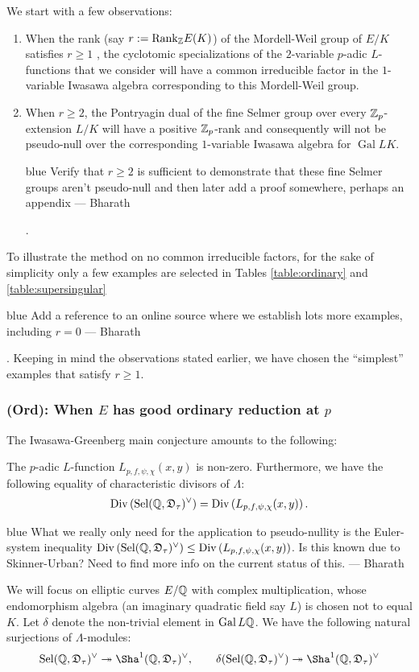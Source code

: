 \documentclass[a4paper,11pt]{article}
\newcommand{\BP}[1]{
	\begin{color}{blue}
		\marginpar{$\heartsuit$} #1
		--- Bharath
	\end{color}
}
\DeclareMathOperator{\Gal}{Gal}
\numberwithin{equation}{section}
\newcommand{\Sel}{\mathrm{Sel}}
\newcommand{\DDD}{\mathfrak{D}}
\begin{document}
We start with a few observations:
\begin{enumerate}
\item When the rank (say $r:=\mathrm{Rank}_{\mathbb{Z}}E(K)$) of the Mordell-Weil group of $E/K$ satisfies $r\geq 1$ , the cyclotomic specializations of the $2$-variable $p$-adic $L$-functions that we consider will have a common irreducible factor in the $1$-variable Iwasawa algebra corresponding to this Mordell-Weil group.
\item When $r \geq 2$, the Pontryagin dual of the fine Selmer group over every $\mathbb{Z}_p$-extension $L/K$ will have a positive $\mathbb{Z}_p$-rank and consequently  will not be pseudo-null over the corresponding $1$-variable Iwasawa algebra for $\Gal{L}{K}$. \BP{Verify that $r\geq 2$ is sufficient to demonstrate that these fine Selmer groups aren't pseudo-null and then later add a proof somewhere, perhaps an appendix}.
\end{enumerate}


To illustrate the method on no common irreducible factors, for the sake of simplicity only a few examples are selected in Tables \ref{table:ordinary} and \ref{table:supersingular} \BP{Add a reference to an online source where we establish lots more examples, including $r=0$}. Keeping in mind the observations stated earlier, we have chosen the ``simplest'' examples that satisfy $r \geq 1$.



\subsubsection*{(Ord): When $E$ has good ordinary reduction at $p$}
The Iwasawa-Greenberg main conjecture amounts to the following:
\begin{conjecture}\label{conj:ordmain}
The $p$-adic $L$-function $L_{p,f,\psi,\chi}(x,y)$ is non-zero. Furthermore, we have the following equality of characteristic divisors of $\Lambda$:
\begin{align*}
\mathrm{Div} \left(\Sel(\Q,\DDD_\tau)^\vee\right) = \Div\left(L_{p,f,\psi,\chi}(x,y)\right).
\end{align*}
\end{conjecture}
\BP{What we really only need for the application to pseudo-nullity is the Euler-system inequality $\mathrm{Div} \left(\Sel(\Q,\DDD_\tau)^\vee\right) \leq \Div\left(L_{p,f,\psi,\chi}(x,y)\right)$. Is this known due to Skinner-Urban? Need to find more info on the current status of this.}


We will focus on elliptic curves $E/\mathbb{Q}$ with complex multiplication, whose endomorphism algebra (an imaginary quadratic field say $L$) is chosen not to equal $K$. Let $\delta$ denote the non-trivial element in $\Gal{L}{\Q}$. We have the following natural surjections of $\Lambda$-modules:
\begin{align} \label{eq:ordsurjection}
\Sel(\Q,\DDD_\tau)^\vee  \twoheadrightarrow \Sha^1(\Q,\DDD_\tau)^\vee, \qquad \delta(\Sel(\Q,\DDD_\tau)^\vee)   \twoheadrightarrow \Sha^1(\Q,\DDD_\tau)^\vee
\end{align}
\end{document}
